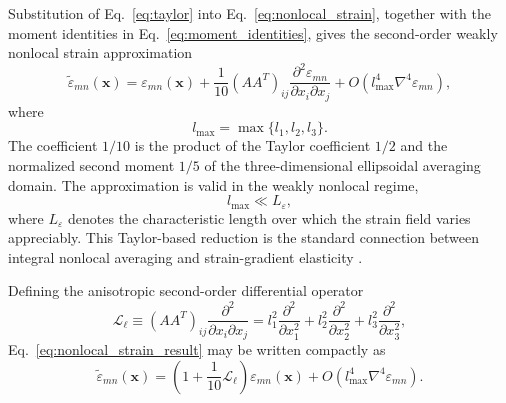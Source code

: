 \documentclass[final,3p,times,fleqn]{elsarticle}
\begin{document}
Substitution of Eq.~\eqref{eq:taylor} into
Eq.~\eqref{eq:nonlocal_strain}, together with the moment identities in
Eq.~\eqref{eq:moment_identities}, gives the second-order weakly
nonlocal strain approximation
\begin{equation}\label{eq:nonlocal_strain_result}
\tilde{\varepsilon}_{mn}(\mathbf{x})
=
\varepsilon_{mn}(\mathbf{x})
+
\frac{1}{10}
(AA^T)_{ij}
\frac{\partial^2\varepsilon_{mn}}
     {\partial x_i\partial x_j}
+
O(l_{\max}^{4}\nabla^{4}\varepsilon_{mn}) ,
\end{equation}
where
\[
    l_{\max}=\max\{l_1,l_2,l_3\}.
\]
The coefficient $1/10$ is the product of the Taylor coefficient $1/2$
and the normalized second moment $1/5$ of the three-dimensional
ellipsoidal averaging domain. The approximation is valid in the weakly
nonlocal regime,
\[
    l_{\max}\ll L_{\varepsilon},
\]
where $L_{\varepsilon}$ denotes the characteristic length over which the
strain field varies appreciably. This Taylor-based reduction is the
standard connection between integral nonlocal averaging and
strain-gradient elasticity
\cite{Aifantis1992,AskesAifantis2011}.

Defining the anisotropic second-order differential operator
\begin{equation}\label{eq:Lop}
\mathcal{L}_{\ell}
\equiv
(AA^T)_{ij}
\frac{\partial^2}{\partial x_i\partial x_j}
=
l_1^2\frac{\partial^2}{\partial x_1^2}
+
l_2^2\frac{\partial^2}{\partial x_2^2}
+
l_3^2\frac{\partial^2}{\partial x_3^2},
\end{equation}
Eq.~\eqref{eq:nonlocal_strain_result} may be written compactly as
\begin{equation}\label{eq:nonlocal_strain_compact}
\tilde{\varepsilon}_{mn}(\mathbf{x})
=
\left(
1+\frac{1}{10}\mathcal{L}_{\ell}
\right)
\varepsilon_{mn}(\mathbf{x})
+
O(l_{\max}^{4}\nabla^{4}\varepsilon_{mn}) .
\end{equation}
\end{document}
